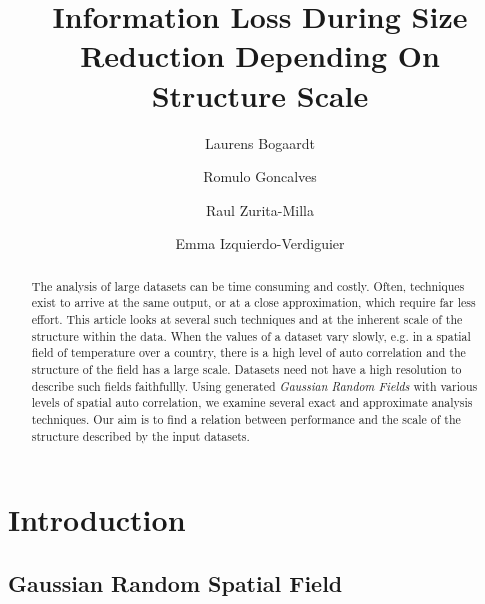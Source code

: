 \documentclass{acm_proc_article-sp}
\begin{document}
\title{\textbf{Information Loss During Size Reduction Depending On Structure Scale}}

\author[1]{Laurens Bogaardt}
\author[1]{Romulo Goncalves}
\author[2]{Raul Zurita-Milla}
\author[2,3]{Emma Izquierdo-Verdiguier}


\date{} %
\maketitle\thispagestyle{empty} %

\begin{abstract}
The analysis of large datasets can be time consuming and costly. Often, techniques exist to arrive at the same output, or at a close approximation, which require far less effort. This article looks at several such techniques and at the inherent scale of the structure within the data. When the values of a dataset vary slowly, e.g. in a spatial field of temperature over a country, there is a high level of auto correlation and the structure of the field has a large scale. Datasets need not have a high resolution to describe such fields faithfullly. Using generated \textit{Gaussian Random Fields} with various levels of spatial auto correlation, we examine several exact and approximate analysis techniques. Our aim is to find a relation between performance and the scale of the structure described by the input datasets.
\end{abstract}

\section{Introduction}
\label{sec:Introduction}

\subsection{Gaussian Random Spatial Field}
\label{sec:Introduction Gaussian Random Spatial Field}
\end{document}
